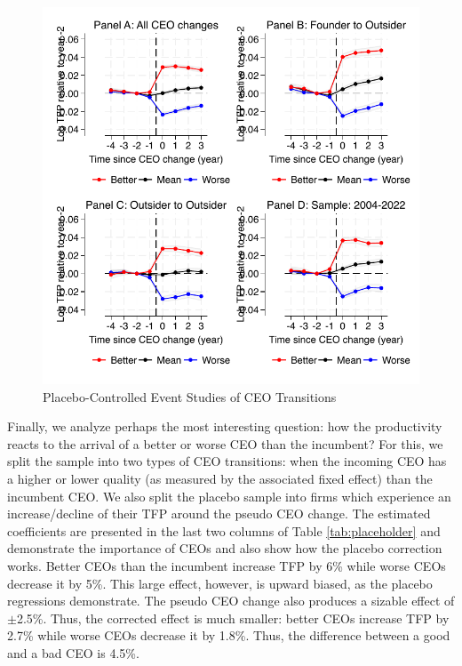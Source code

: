 \documentclass[11pt,a4paper]{article}
\begin{document}
\begin{figure}[htbp]
\centering
\includegraphics[width=\textwidth]{figure/figure1.pdf}
\caption{Placebo-Controlled Event Studies of CEO Transitions}
\label{fig:event_study_main}
\end{figure}

Finally, we analyze perhaps the most interesting question: how the productivity reacts to the arrival of a better or worse CEO than the incumbent? For this, we split the sample into two types of CEO transitions: when the incoming CEO has a higher or lower quality (as measured by the associated fixed effect) than the incumbent CEO. We also split the placebo sample into firms which experience an increase/decline of their TFP around the pseudo CEO change. The estimated coefficients are presented in the last two columns of Table \ref{tab:placeholder} and demonstrate the importance of CEOs and also show how the placebo correction works. Better CEOs than the incumbent increase TFP by 6\% while worse CEOs decrease it by 5\%. This large effect, however, is upward biased, as the placebo regressions demonstrate. The pseudo CEO change also produces a sizable effect of $\pm$2.5\%. Thus, the corrected effect is much smaller: better CEOs increase TFP by 2.7\% while worse CEOs decrease it by 1.8\%. Thus, the difference between a good and a bad CEO is 4.5\%. 
\end{document}

